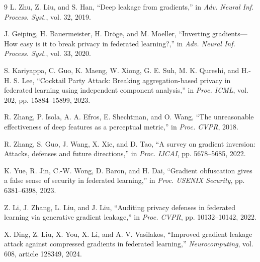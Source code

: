 \documentclass{article}
\begin{document}
\begin{thebibliography}{9}
L. Zhu, Z. Liu, and S. Han, ``Deep leakage from gradients,'' in \emph{Adv.
Neural Inf. Process. Syst.}, vol. 32, 2019.

J. Geiping, H. Bauermeister, H. Dr\"oge, and M. Moeller, ``Inverting
gradients---How easy is it to break privacy in federated learning?,'' in
\emph{Adv. Neural Inf. Process. Syst.}, vol. 33, 2020.

S. Kariyappa, C. Guo, K. Maeng, W. Xiong, G. E. Suh, M. K. Qureshi, and
H.-H. S. Lee, ``Cocktail Party Attack: Breaking aggregation-based privacy in
federated learning using independent component analysis,'' in \emph{Proc.
ICML}, vol. 202, pp. 15884--15899, 2023.

R. Zhang, P. Isola, A. A. Efros, E. Shechtman, and O. Wang, ``The unreasonable
effectiveness of deep features as a perceptual metric,'' in \emph{Proc. CVPR},
2018.

R. Zhang, S. Guo, J. Wang, X. Xie, and D. Tao, ``A survey on gradient
inversion: Attacks, defenses and future directions,'' in \emph{Proc. IJCAI},
pp. 5678--5685, 2022.

K. Yue, R. Jin, C.-W. Wong, D. Baron, and H. Dai, ``Gradient obfuscation gives
a false sense of security in federated learning,'' in \emph{Proc. USENIX
Security}, pp. 6381--6398, 2023.

Z. Li, J. Zhang, L. Liu, and J. Liu, ``Auditing privacy defenses in federated
learning via generative gradient leakage,'' in \emph{Proc. CVPR},
pp. 10132--10142, 2022.

X. Ding, Z. Liu, X. You, X. Li, and A. V. Vasilakos, ``Improved gradient
leakage attack against compressed gradients in federated learning,''
\emph{Neurocomputing}, vol. 608, article 128349, 2024.
\end{thebibliography}
\end{document}
